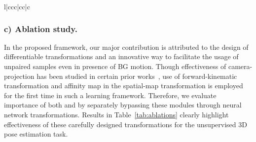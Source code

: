\documentclass[letterpaper]{article} \usepackage{aaai20}  \usepackage{times}  \usepackage{helvet}  \usepackage{courier}  \usepackage{url}  \usepackage{graphicx}  \usepackage{amsmath}
\begin{document}
\begin{table}[t]
{\begin{tabular}{l|ccc|cc|c}
{{\begin{table}[t]
	\footnotesize
	\caption{ 
	Results on ablations of the proposed framework. It clearly highlights importance of , , and use of  in the unsupervised training pipeline. Notice the improvement in 3DPCK on the unseen 3DHP testset as a result of incorporating  in the unsupervised training pipeline.
	}
	\centering
	\setlength\tabcolsep{6.0pt}
	\vspace{-2mm}
	\label{tab:ablations}
\end{table} 





\subsubsection{c) Ablation study.}
In the proposed framework, our major contribution is attributed to the design of differentiable transformations and an innovative way to facilitate the usage of unpaired samples even in presence of BG motion. Though effectiveness of camera-projection has been studied in certain prior works~\cite{chen2019unsupervised}, use of forward-kinematic transformation  and affinity map in the spatial-map transformation  is employed for the first time in such a learning framework. Therefore, we evaluate importance of both  and  by separately bypassing these modules through neural network transformations. Results in Table~\ref{tab:ablations} clearly highlight effectiveness of these carefully designed transformations for the unsupervised 3D pose estimation task.

}}
\end{tabular}}
\end{table}
\end{document}
